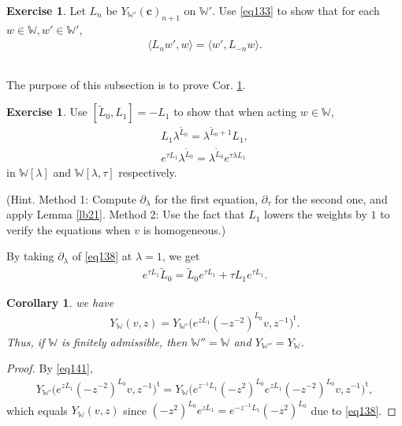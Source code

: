\documentclass[12pt,a4paper,notitlepage]{article}
\theoremstyle{definition}
\newtheorem{exe}[df]{Exercise}
\theoremstyle{plain}
\newtheorem{co}[df]{Corollary}
\newcommand{\wtd}{\widetilde}
\newcommand{\tr}{\mathrm{t}} %
\newcommand{\bk}[1]{\langle {#1}\rangle}
\newcommand{\Wbb}{\mathbb W}
\newcommand{\cbf}{\mathbf c}
\numberwithin{equation}{section}
\begin{document}
\begin{exe}
Let $L_n$ be $Y_{\Wbb'}(\cbf)_{n+1}$ on $\Wbb'$. Use \eqref{eq133} to show that for each $w\in\Wbb,w'\in\Wbb'$,
\begin{align}
\bk{L_nw',w}=\bk{w',L_{-n}w}.	
\end{align}
\end{exe}




\subsection{}

The purpose of this subsection is to prove Cor. \ref{lb91}.

\begin{exe}\label{lb99}
	Use $[\wtd L_0,L_1]=-L_1$ to show that when acting $w\in\Wbb$,
	\begin{subequations}
		\begin{gather}
			L_1	\lambda^{\wtd L_0}=\lambda^{\wtd L_0+1}L_1,\label{eq137}\\
			e^{\tau L_1}\lambda^{\wtd L_0}=\lambda^{\wtd L_0}e^{\tau\lambda L_1}	\label{eq138}
		\end{gather}
	\end{subequations}
	in $\Wbb[\lambda]$ and $\Wbb[\lambda,\tau]$ respectively.
	
	(Hint. Method 1: Compute $\partial_\lambda$ for the first equation,  $\partial_{\tau}$ for the second one, and apply Lemma \ref{lb21}. Method 2: Use the fact that $L_1$ lowers the weights by $1$ to verify the equations when $v$ is homogeneous.)
\end{exe}
By taking $\partial_\lambda$ of \eqref{eq138} at $\lambda=1$, we get
\begin{align}
	e^{\tau L_1}\wtd L_0=\wtd L_0e^{\tau L_1}+\tau L_1e^{\tau L_1}.\label{eq139}	
\end{align}

\begin{co}\label{lb91}
	we have
	\begin{align}
		Y_\Wbb(v,z)=Y_{\Wbb'}\big(e^{zL_1}(-z^{-2})^{L_0}v,z^{-1}\big)^\tr.	
	\end{align}
	Thus, if $\Wbb$ is finitely admissible, then $\Wbb''=\Wbb$ and $Y_{\Wbb''}=Y_\Wbb$. 
\end{co}

\begin{proof}
	By \eqref{eq141},
	\begin{align*}
		Y_{\Wbb'}\big(e^{zL_1}(-z^{-2})^{L_0}v,z^{-1}\big)^\tr=Y_\Wbb\big(e^{z^{-1}L_1}(-z^2)^{L_0}e^{zL_1}(-z^{-2})^{L_0}v,z^{-1} \big)^\tr,	
	\end{align*}
	which equals $Y_\Wbb(v,z)$ since $(-z^2)^{L_0}e^{zL_1}=e^{-z^{-1}L_1}(-z^2)^{L_0}$ due to \eqref{eq138}.
\end{proof}
\end{document}
